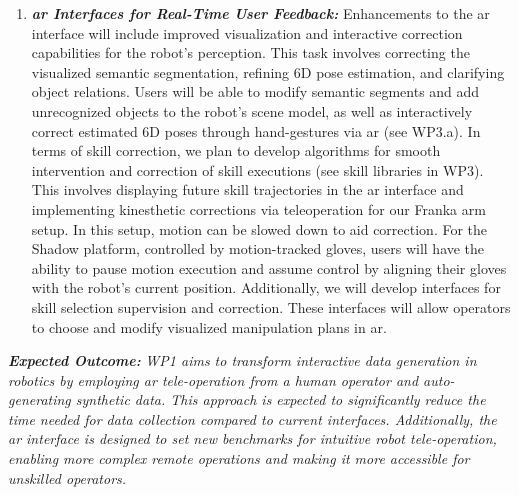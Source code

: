 \documentclass{erc-B2}
\begin{document}
\begin{enumerate}
\item \textit{\textbf{\gls*{ar} Interfaces for Real-Time User Feedback:}} Enhancements to the \gls*{ar} interface will include improved visualization and interactive correction capabilities for the robot's perception. This task involves correcting the visualized semantic segmentation, refining 6D pose estimation, and clarifying object relations. Users will be able to modify semantic segments and add unrecognized objects to the robot's scene model, as well as interactively correct estimated 6D poses through hand-gestures via \gls*{ar} (see WP3.a). 
In terms of skill correction, we plan to develop algorithms for smooth intervention and correction of skill executions (see skill libraries in WP3). This involves displaying future skill trajectories in the \gls*{ar} interface and implementing kinesthetic corrections via teleoperation for our Franka arm setup. In this setup, motion can be slowed down to aid correction. For the Shadow platform, controlled by motion-tracked gloves, users will have the ability to pause motion execution and assume control by aligning their gloves with the robot's current position.
Additionally, we will develop interfaces for skill selection supervision and correction. These interfaces will allow operators to choose and modify visualized manipulation plans in \gls*{ar}.%
\end{enumerate}
\textbf{\textit{Expected Outcome:}} \textit{WP1 aims to transform interactive data generation in robotics by employing \gls*{ar} tele-operation from a human operator and auto-generating synthetic data. This approach is expected to significantly reduce the time needed for data collection compared to current interfaces. Additionally, the \gls*{ar} interface is designed to set new benchmarks for intuitive robot tele-operation, enabling more complex remote operations and making it more accessible for unskilled operators.}


\end{document}
